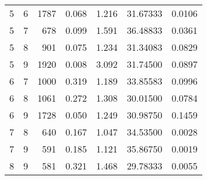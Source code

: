 \begin{longtable}{rrrrrrr}
5 & 6 & 1787 & 0.068 & 1.216 & 31.67333 & 0.0106 \\ 
5 & 7 & 678 & 0.099 & 1.591 & 36.48833 & 0.0361 \\ 
5 & 8 & 901 & 0.075 & 1.234 & 31.34083 & 0.0829 \\ 
5 & 9 & 1920 & 0.008 & 3.092 & 31.74500 & 0.0897 \\ 
6 & 7 & 1000 & 0.319 & 1.189 & 33.85583 & 0.0996 \\ 
6 & 8 & 1061 & 0.272 & 1.308 & 30.01500 & 0.0784 \\ 
6 & 9 & 1728 & 0.050 & 1.249 & 30.98750 & 0.1459 \\ 
7 & 8 & 640 & 0.167 & 1.047 & 34.53500 & 0.0028 \\ 
7 & 9 & 591 & 0.185 & 1.121 & 35.86750 & 0.0019 \\ 
8 & 9 & 581 & 0.321 & 1.468 & 29.78333 & 0.0055 \\ 
\bottomrule
\end{longtable}

